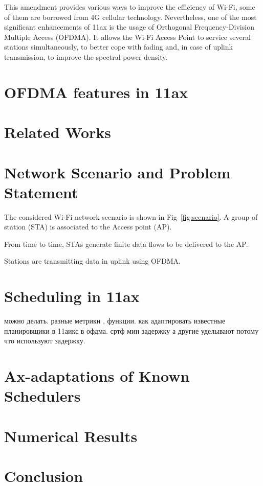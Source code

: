 This amendment provides various ways to improve the efficiency of Wi-Fi, some of them are borrowed from 4G cellular technology. 
Nevertheless, one of the most significant enhancements of 11ax is the usa\-ge of Orthogonal Frequency-Division Multiple Access (OFDMA). 
It allows the Wi-Fi Access Point to service several stations simultaneously, to better cope with fading and, in case of uplink transmission, to improve the spectral power density.

\section{OFDMA features in 11ax}

\section{Related Works}

\section{Network Scenario and Problem Statement}

The considered Wi-Fi network scenario is shown in Fig~\ref{fig:scenario}. A group of station (STA) is associated to the Access point (AP). 

From time to time, STAs generate finite data flows to be delivered to the AP.

Stations are transmitting data in uplink using OFDMA. 

\section{Scheduling in 11ax}

можно делать. разные метрики , функции. как адаптировать известные планировщики в 11аикс в офдма. 
сртф мин задержку а другие уделывают потому что используют задержку. 

\section{Ax-adaptations of Known Schedulers}

\section{Numerical Results}

\section{Conclusion}

